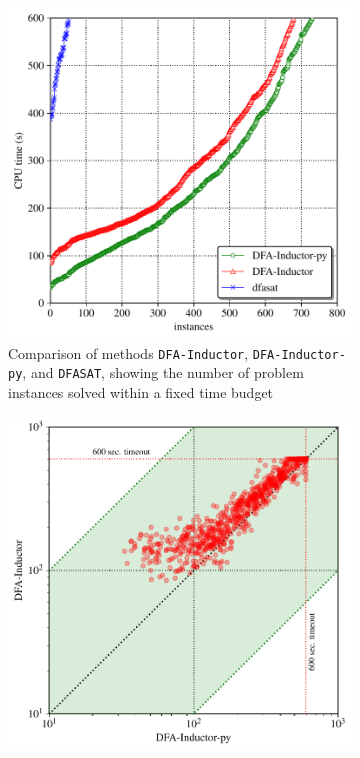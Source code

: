 \begin{figure}[ht]
  \centering
  \begin{subfigure}[b]{0.48\textwidth}
    \centering
    \includegraphics[width=\textwidth]{img/lata19/plots/cactus}
    \caption{Comparison of methods \texttt{DFA-Inductor}, \texttt{DFA-Inductor-py}, and \texttt{DFASAT}, showing the number of problem instances solved within a fixed time budget}
    \label{syn-en:img:plots:cactus}
  \end{subfigure}%
  \;\;
  \begin{subfigure}[b]{0.48\textwidth}
    \centering
    \includegraphics[width=\textwidth]{img/lata19/plots/scatter}

\end{subfigure}
\end{figure}
